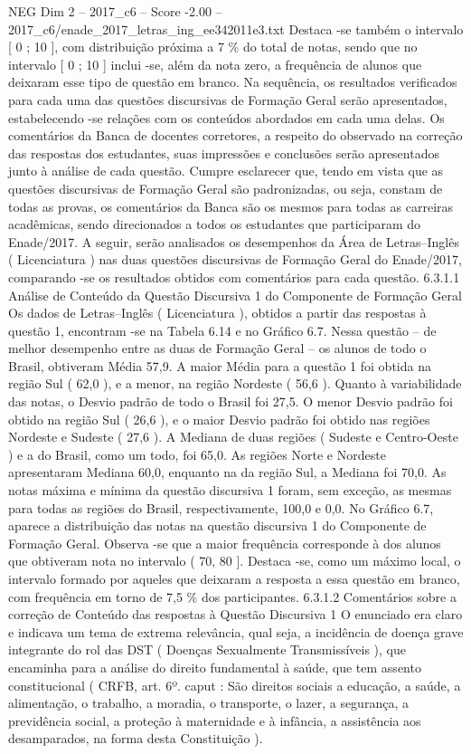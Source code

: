 \begin{textsample}{NEG Dim 2 – 2017\_c6 – Score -2.00 – 2017\_c6/enade\_2017\_letras\_ing\_ee342011e3.txt}
Destaca -se também o intervalo [ 0 ; 10 ], com distribuição próxima a 7 \% do total de notas, sendo que no intervalo [ 0 ; 10 ] inclui -se, além da nota zero, a frequência de alunos que deixaram esse tipo de questão em branco.
Na sequência, os resultados verificados para cada uma das questões discursivas de Formação Geral serão apresentados, estabelecendo -se relações com os conteúdos abordados em cada uma delas.
Os comentários da Banca de docentes corretores, a respeito do observado na correção das respostas dos estudantes, suas impressões e conclusões serão apresentados junto à análise de cada questão.
Cumpre esclarecer que, tendo em vista que as questões discursivas de Formação Geral são padronizadas, ou seja, constam de todas as provas, os comentários da Banca são os mesmos para todas as carreiras acadêmicas, sendo direcionados a todos os estudantes que participaram do Enade/2017.
A seguir, serão analisados os desempenhos da Área de Letras–Inglês ( Licenciatura ) nas duas questões discursivas de Formação Geral do Enade/2017, comparando -se os resultados obtidos com comentários para cada questão. 6.3.1.1 Análise de Conteúdo da Questão Discursiva 1 do Componente de Formação Geral Os dados de Letras–Inglês ( Licenciatura ), obtidos a partir das respostas à questão 1, encontram -se na Tabela 6.14 e no Gráfico 6.7.
Nessa questão – de melhor desempenho entre as duas de Formação Geral – os alunos de todo o Brasil, obtiveram Média 57,9.
A maior Média para a questão 1 foi obtida na região Sul ( 62,0 ), e a menor, na região Nordeste ( 56,6 ).
Quanto à variabilidade das notas, o Desvio padrão de todo o Brasil foi 27,5.
O menor Desvio padrão foi obtido na região Sul ( 26,6 ), e o maior Desvio padrão foi obtido nas regiões Nordeste e Sudeste ( 27,6 ).
A Mediana de duas regiões ( Sudeste e Centro-Oeste ) e a do Brasil, como um todo, foi 65,0.
As regiões Norte e Nordeste apresentaram Mediana 60,0, enquanto na da região Sul, a Mediana foi 70,0.
As notas máxima e mínima da questão discursiva 1 foram, sem exceção, as mesmas para todas as regiões do Brasil, respectivamente, 100,0 e 0,0.
No Gráfico 6.7, aparece a distribuição das notas na questão discursiva 1 do Componente de Formação Geral.
Observa -se que a maior frequência corresponde à dos alunos que obtiveram nota no intervalo ( 70, 80 ].
Destaca -se, como um máximo local, o intervalo formado por aqueles que deixaram a resposta a essa questão em branco, com frequência em torno de 7,5 \% dos participantes. 6.3.1.2 Comentários sobre a correção de Conteúdo das respostas à Questão Discursiva 1 O enunciado era claro e indicava um tema de extrema relevância, qual seja, a incidência de doença grave integrante do rol das DST ( Doenças Sexualmente Transmissíveis ), que encaminha para a análise do direito fundamental à saúde, que tem assento constitucional ( CRFB, art. 6º. caput : São direitos sociais a educação, a saúde, a alimentação, o trabalho, a moradia, o transporte, o lazer, a segurança, a previdência social, a proteção à maternidade e à infância, a assistência aos desamparados, na forma desta Constituição ).

\end{textsample}
